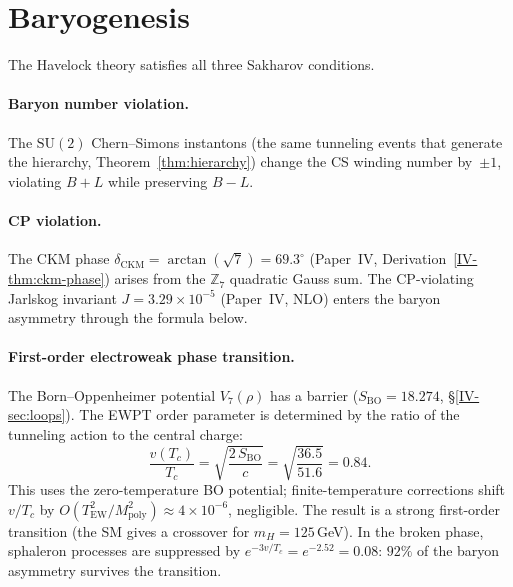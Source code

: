 \section{Baryogenesis}
\label{sec:baryogenesis}

The Havelock theory satisfies all three Sakharov conditions.

\paragraph{Baryon number violation.}
The $\mathrm{SU}(2)$ Chern--Simons instantons (the same tunneling
events that generate the hierarchy, Theorem~\ref{thm:hierarchy})
change the CS winding number by~$\pm 1$, violating $B{+}L$
while preserving $B{-}L$.

\paragraph{CP violation.}
The CKM phase $\delta_{\mathrm{CKM}} = \arctan(\sqrt{7}) = 69.3^\circ$
(Paper~IV, Derivation~\ref*{IV-thm:ckm-phase})
arises from the $\mathbb{Z}_7$ quadratic Gauss sum.
The CP-violating Jarlskog invariant
$J = 3.29 \times 10^{-5}$ (Paper~IV, NLO) enters the baryon asymmetry
through the formula below.

\paragraph{First-order electroweak phase transition.}
The Born--Oppenheimer potential $V_7(\rho)$ has a barrier
($S_{\mathrm{BO}} = 18.274$, \S\ref*{IV-sec:loops}).
The EWPT order parameter is determined by the ratio of the
tunneling action to the central charge:
\begin{equation}\label{eq:v-over-Tc}
  \frac{v(T_c)}{T_c}
  = \sqrt{\frac{2\,S_{\mathrm{BO}}}{c}}
  = \sqrt{\frac{36.5}{51.6}} = 0.84.
\end{equation}
This uses the zero-temperature BO potential; finite-temperature
corrections shift $v/T_c$ by $O(T_{\mathrm{EW}}^2/M_{\mathrm{poly}}^2)
\approx 4 \times 10^{-6}$, negligible.
The result is a strong first-order transition (the SM gives
a crossover for $m_H = 125$\,GeV).
In the broken phase, sphaleron processes are suppressed by
$e^{-3v/T_c} = e^{-2.52} = 0.08$: $92\%$ of the baryon asymmetry
survives the transition.

